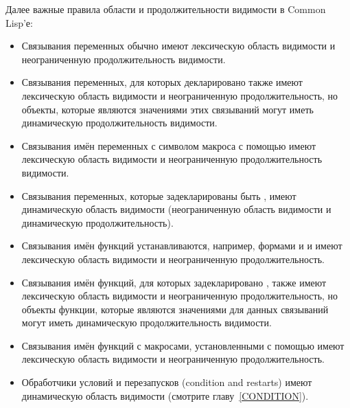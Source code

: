 Далее важные правила области и продолжительности видимости в Common Lisp'е:
\begin{itemize}
\item Связывания переменных обычно имеют лексическую область видимости и неограниченную
  продолжительность видимости.
\end{itemize}

\begin{itemize}
\item Связывания переменных, для которых декларировано  также
  имеют лексическую область видимости и неограниченную продолжительность, но
  объекты, которые являются значениями этих связываний могут иметь динамическую
  продолжительность видимости.

\item Связывания имён переменных с символом макроса с помощью
   имеют лексическую область видимости и неограниченную
  продолжительность видимости.
\end{itemize}

\begin{itemize}
\item 
  Связывания переменных, которые задекларированы быть ,
  имеют динамическую область видимости (неограниченную область видимости и
  динамическую продолжительность).
\end{itemize}

\begin{itemize}

\item Связывания имён функций устанавливаются, например, формами  и
   и имеют лексическую область видимости и неограниченную продолжительность.

\item Связывания имён функций, для которых задекларировано ,
  также имеют лексическую область видимости и неограниченную продолжительность,
  но объекты функции, которые являются значениями для данных связываний могут
  иметь динамическую продолжительность видимости.

\item Связывания имён функций с макросами, установленными с помощью
   имеют лексическую область видимости и неограниченную
  продолжительность.

\item Обработчики условий и перезапусков (condition and restarts) имеют
  динамическую область видимости (смотрите главу~\ref{CONDITION}).
\end{itemize}

